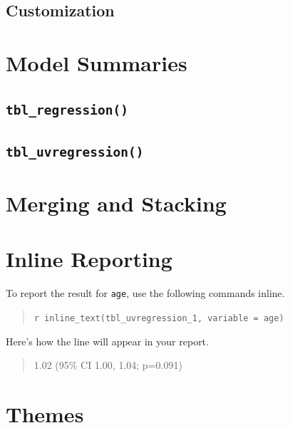 \documentclass[
]{article}
\begin{document}
\hypertarget{customization}{%
\subsection{Customization}\label{customization}}

\hypertarget{model-summaries}{%
\section{Model Summaries}\label{model-summaries}}

\hypertarget{tbl_regression}{%
\subsection{\texorpdfstring{\texttt{tbl\_regression()}}{tbl\_regression()}}\label{tbl_regression}}

\hypertarget{tbl_uvregression}{%
\subsection{\texorpdfstring{\texttt{tbl\_uvregression()}}{tbl\_uvregression()}}\label{tbl_uvregression}}

\hypertarget{merging-and-stacking}{%
\section{Merging and Stacking}\label{merging-and-stacking}}

\hypertarget{inline-reporting}{%
\section{Inline Reporting}\label{inline-reporting}}

To report the result for \texttt{age}, use the following commands
inline.

\begin{quote}
\texttt{\textasciigrave{}r\ inline\_text(tbl\_uvregression\_1,\ variable\ =\ age)\textasciigrave{}}
\end{quote}

Here's how the line will appear in your report.

\begin{quote}
1.02 (95\% CI 1.00, 1.04; p=0.091)
\end{quote}

\hypertarget{themes}{%
\section{Themes}\label{themes}}
\end{document}
